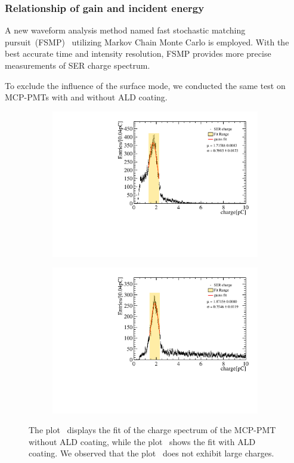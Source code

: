 \subsubsection{Relationship of gain and incident energy}
A new waveform analysis method named fast stochastic matching pursuit~(FSMP)~\cite{Xu_2022}
utilizing Markov Chain Monte Carlo is employed. With the best accurate time and intensity resolution,
FSMP provides more precise measurements of SER charge spectrum.

To exclude the influence of the surface mode, we conducted the same test on MCP-PMTs with and without ALD coating.
\begin{figure}[ht]
    \centering
    \begin{subfigure}[b]{0.48\textwidth}
        \centering
        \includegraphics[width=\textwidth]{pic/SER_noALD.pdf}
        \caption{}
        \label{fig:gain_noald}
    \end{subfigure}
    \hfill
    \begin{subfigure}[b]{0.48\textwidth}
        \centering
        \includegraphics[width=\textwidth]{pic/SER_ALD.pdf}
        \caption{}
        \label{fig:gain_ald}
    \end{subfigure}
    \caption{The plot~ displays the fit of the charge spectrum of the MCP-PMT without ALD coating,
        while the plot~ shows the fit with ALD coating.
        We observed that the plot~ does not exhibit large charges.}
    \label{fig:gain_fit}
\end{figure}

